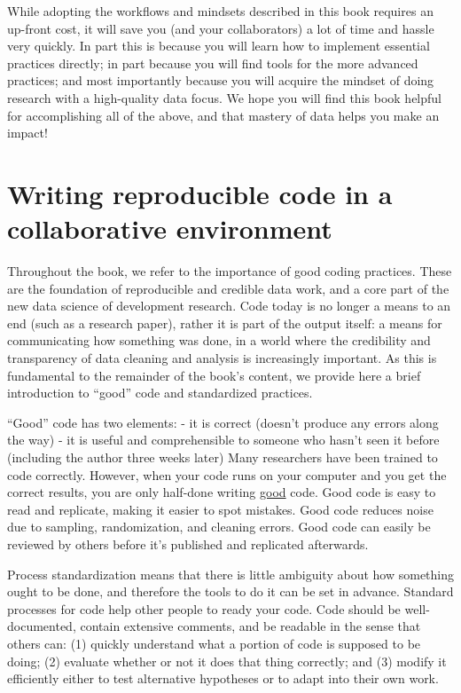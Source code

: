 While adopting the workflows and mindsets described in this book requires an up-front cost,
it will save you (and your collaborators) a lot of time and hassle very quickly.
In part this is because you will learn how to implement essential practices directly;
in part because you will find tools for the more advanced practices;
and most importantly because you will acquire the mindset of doing research with a high-quality data focus.
We hope you will find this book helpful for accomplishing all of the above,
and that mastery of data helps you make an impact!


\section{Writing reproducible code in a collaborative environment}
Throughout the book, we refer to the importance of good coding practices. 
These are the foundation of reproducible and credible data work,
and a core part of the new data science of development research.
Code today is no longer a means to an end (such as a research paper),
rather it is part of the output itself: a means for communicating how something was done,
in a world where the credibility and transparency of data cleaning and analysis is increasingly important.
As this is fundamental to the remainder of the book's content, 
we provide here a brief introduction to ``good'' code and standardized practices.

``Good'' code has two elements:
- it is correct (doesn't produce any errors along the way)
- it is useful and comprehensible to someone who hasn't seen it before (including the author three weeks later)
Many researchers have been trained to code correctly. 
However, when your code runs on your computer and you get the correct results, you are only half-done writing \underline{good} code.
Good code is easy to read and replicate, making it easier to spot mistakes.
Good code reduces noise due to sampling, randomization, and cleaning errors.
Good code can easily be reviewed by others before it's published and replicated afterwards.

Process standardization means that there is
little ambiguity about how something ought to be done,
and therefore the tools to do it can be set in advance.
Standard processes for code help other people to ready your code. 
Code should be well-documented, contain extensive comments, and be readable in the sense that others can:
(1) quickly understand what a portion of code is supposed to be doing;
(2) evaluate whether or not it does that thing correctly; and
(3) modify it efficiently either to test alternative hypotheses
or to adapt into their own work.

